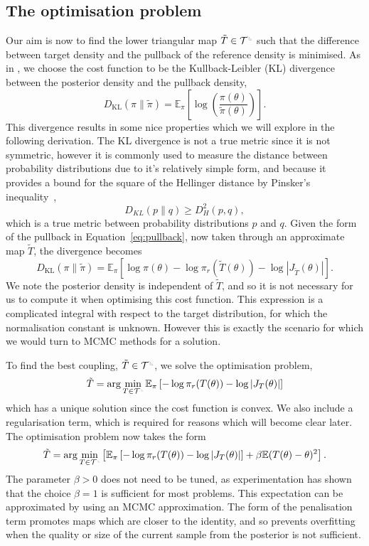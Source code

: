 \documentclass[final]{siamltex}
\newcommand{\ltri}{%
\,\resizebox{!}{0.25\baselineskip}{%
\begin{tikzpicture}%
\draw[line width=1mm](0,0) -- (0,2) -- (2,0)  -- (0,0);
\end{tikzpicture}%
}\xspace%
}%
\newcommand{\smallltri}{%
\,\resizebox{!}{0.15\baselineskip}{%
\begin{tikzpicture}%
\draw[line width=1mm](0,0) -- (0,2) -- (2,0)  -- (0,0);
\end{tikzpicture}%
}\xspace%
}%
\begin{document}
\subsection{The optimisation problem}
Our aim is now to find the lower triangular map $\tilde{T} \in
\mathcal{T}^{\ltri}$ such that the difference between target
density and the pullback of the reference density is minimised. As in
\cite{parno2014transport}, we choose the cost function
to be the Kullback-Leibler (KL) divergence between the posterior density and the pullback density,
\[
	D_\text{KL}(\pi\|\tilde{\pi}) =
		\mathbb{E}_\pi\left[\log\left(\frac{\pi(\theta)}{\tilde{\pi}(\theta)}\right)\right].
\]
This divergence results in some nice properties which we will explore in the following derivation. The KL divergence is not a true metric since it is not symmetric, however it is commonly used to measure the distance between probability distributions due to it's relatively simple form, and because it provides a bound for the square of the Hellinger distance by Pinsker's inequality~\cite{pinsker1960information},
\[
	D_{KL}(p\|q) \geq D_H^2(p,q),
\]
which is a true metric between probability distributions $p$ and $q$.
Given the form of the pullback in Equation~\eqref{eq:pullback}, now taken through an approximate map $\tilde{T}$, the divergence becomes
\[
	D_\text{KL}(\pi\|\tilde{\pi}) = \mathbb{E}_\pi\left[\log\pi(\theta) - \log\pi_r(\tilde{T}(\theta)) -
		\log\left|J_{\tilde{T}}(\theta)\right|\right].
\]
We note the posterior density is independent of $\tilde{T}$, and so it is not necessary for us to compute it when optimising this cost function. This expression is a complicated integral with respect to the target distribution, for which the normalisation constant is unknown. However this is exactly the scenario for which we would turn to MCMC methods for a solution.

To find the best coupling, $\tilde{T} \in \mathcal{T}^{\ltri}$, we solve the optimisation problem,
\[
	\tilde{T} = \arg\min_{T \in \mathcal{T}^{\smallltri}} \mathbb{E}_\pi\left[-\log\pi_r(T(\theta)) -
		\log\left|J_T(\theta)\right|\right]
\]
which has a unique solution since the cost function is convex. We also include a regularisation term, which is required for reasons which will become clear later. The optimisation problem now takes the form
\begin{equation}\label{eq:gen_map_optim}
	\tilde{T} = \arg\min_{T\in\mathcal{T}^{\smallltri}} \left[
		 \mathbb{E}_\pi\left[-\log\pi_r(T(\theta)) -
		\log\left|J_T(\theta)\right|\right] + \beta\mathbb{E}(T(\theta)- \theta)^2 \right].
\end{equation}
The parameter $\beta>0$ does not need to be tuned, as experimentation has shown that the choice
$\beta=1$ is sufficient for most problems. This expectation can be
approximated by using an MCMC approximation. The form of the penalisation term promotes maps which are
closer to the identity, and so prevents overfitting when the quality
or size of the current sample from the posterior is not sufficient.
\end{document}
